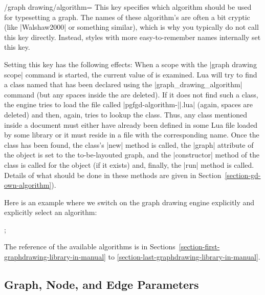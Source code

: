 \begin{key}{/graph drawing/algorithm=}
  \label{section-gd-algorithm-key}%
  This key specifies which algorithm should be used for typesetting a
  graph. The names of these algorithm's are often a bit cryptic (like
  |Walshaw2000| or something similar), which is why you typically do
  not call this key directly. Instead, styles with more
  easy-to-remember names internally set this key.

  Setting this key has the following effects: When a scope with the
  |graph drawing scope| command is started, the current value of
   is examined. Lua will try to find a class
  named  that has been declared using the
  |graph_drawing_algorithm| command (but any spaces inside the
   are deleted). If it does not find such a
  class, the engine tries to  
  load the file called |pgfgd-algorithm-||.lua|
  (again, spaces are deleted) and then, again, tries to lookup the
  class. Thus, any class  mentioned inside a
  document must either have 
  already been defined in some Lua file loaded by some library or it
  must reside in a file with the corresponding name. Once the class
  has been found, the class's |new| method is called, the |graph|
  attribute of the object is set to the to-be-layouted graph, and the
  |constructor| method of the class is called for the object (if it
  exists) and, finally, the |run| method is called. Details of what
  should be done in these methods are given in
  Section~\ref{section-gd-own-algorithm}).  

  Here is an example where we switch on the graph drawing engine
  explicitly and explicitly select an algorithm:
\begin{codeexample}[]
\tikz [graph drawing scope,
       /graph drawing/algorithm=Spring Electrical Walshaw 2000]
  ;  
\end{codeexample}

  The reference of the available algorithms is in
  Sections~\ref{section-first-graphdrawing-library-in-manual} to 
  \ref{section-last-graphdrawing-library-in-manual}.
\end{key}




\subsection{Graph, Node, and Edge Parameters}

